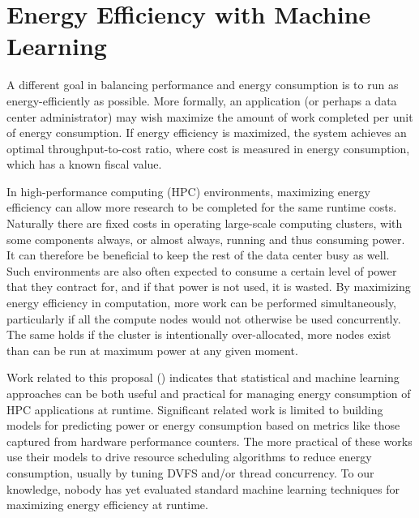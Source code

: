 \section{Energy Efficiency with Machine Learning}

A different goal in balancing performance and energy consumption is to run as energy-efficiently as possible.
More formally, an application (or perhaps a data center administrator) may wish maximize the amount of work completed per unit of energy consumption.
If energy efficiency is maximized, the system achieves an optimal throughput-to-cost ratio, where cost is measured in energy consumption, which has a known fiscal value.

In high-performance computing (HPC) environments, maximizing energy efficiency can allow more research to be completed for the same runtime costs.
Naturally there are fixed costs in operating large-scale computing clusters, with some components always, or almost always, running and thus consuming power.
It can therefore be beneficial to keep the rest of the data center busy as well.
Such environments are also often expected to consume a certain level of power that they contract for, and if that power is not used, it is wasted.
By maximizing energy efficiency in computation, more work can be performed simultaneously, particularly if all the compute nodes would not otherwise be used concurrently.
The same holds if the cluster is intentionally over-allocated, \ie more nodes exist than can be run at maximum power at any given moment.

Work related to this proposal () indicates that statistical and machine learning approaches can be both useful and practical for managing energy consumption of HPC applications at runtime.
Significant related work is limited to building models for predicting power or energy consumption based on metrics like those captured from hardware performance counters.
The more practical of these works use their models to drive resource scheduling algorithms to reduce energy consumption, usually by tuning DVFS and/or thread concurrency.
To our knowledge, nobody has yet evaluated standard machine learning techniques for maximizing energy efficiency at runtime.


